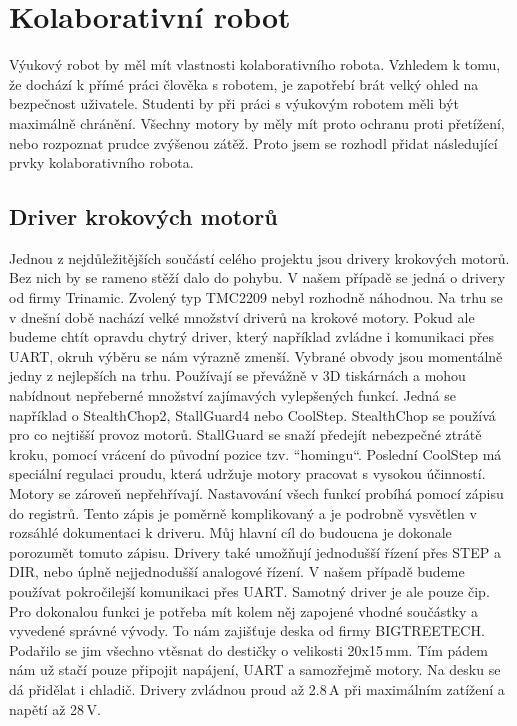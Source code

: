 \section{Kolaborativní robot}
Výukový robot by měl mít vlastnosti kolaborativního robota. Vzhledem k tomu, že dochází k přímé práci člověka s robotem, je zapotřebí brát velký ohled na bezpečnost uživatele. Studenti by při práci s výukovým robotem měli být maximálně chránění. Všechny motory by měly mít proto ochranu proti přetížení, nebo rozpoznat prudce zvýšenou zátěž. Proto jsem se rozhodl přidat následu\-jí\-cí prvky kolaborativního robota. \cite{Websy}
\subsection{Driver krokových motorů}
Jednou z nejdůležitějších součástí celého projektu jsou drivery krokových motorů. Bez nich 
by se rameno stěží dalo do pohybu. V našem případě se jedná o drivery od firmy Trinamic. 
Zvolený typ TMC2209 nebyl rozhodně náhodnou. Na trhu se v dnešní době nachází velké 
množství driverů na krokové motory. Pokud ale budeme chtít opravdu chytrý driver, který 
například zvládne i komunikaci přes UART, okruh výběru se nám výrazně zmenší. Vybrané 
obvody jsou momentálně jedny z nejlepších na trhu. Používají se převážně v 3D tiskárnách a 
mohou nabídnout nepřeberné množství zajímavých vylepšených funkcí. Jedná se například o 
StealthChop2, StallGuard4 nebo CoolStep. StealthChop se používá pro co nejtišší provoz 
motorů. StallGuard se snaží předejít nebezpečné ztrátě kroku, pomocí vrácení do původní 
pozice tzv. “homingu“. Poslední CoolStep má speciální regulaci proudu, která udržuje motory 
pracovat s vysokou účinností. Motory se zároveň nepřehřívají. Nastavování všech funkcí 
probíhá pomocí zápisu do registrů. Tento zápis je poměrně komplikovaný a je podrobně 
vysvětlen v rozsáhlé dokumentaci k driveru. Můj hlavní cíl do budoucna je dokonale porozumět 
tomuto zápisu. Drivery také umožňují jednodušší řízení přes STEP a DIR, nebo úplně 
nejjednodušší analogové řízení. V našem případě budeme používat pokročilejší komunikaci 
přes UART. Samotný driver je ale pouze čip. Pro dokonalou funkci je potřeba mít kolem něj 
zapojené vhodné součástky a vyvedené správné vývody. To nám zajišťuje deska od firmy
BIGTREETECH. Podařilo se jim všechno vtěsnat do destičky o velikosti 20x15\,mm. Tím 
pádem nám už stačí pouze připojit napájení, UART a samozřejmě motory. Na desku se dá 
přidělat i chladič. Drivery zvládnou proud až 2.8\,A při maximálním zatížení a napětí až 28\,V. \cite{TMC2209} \cite{bibtex:Kratochvíl}

